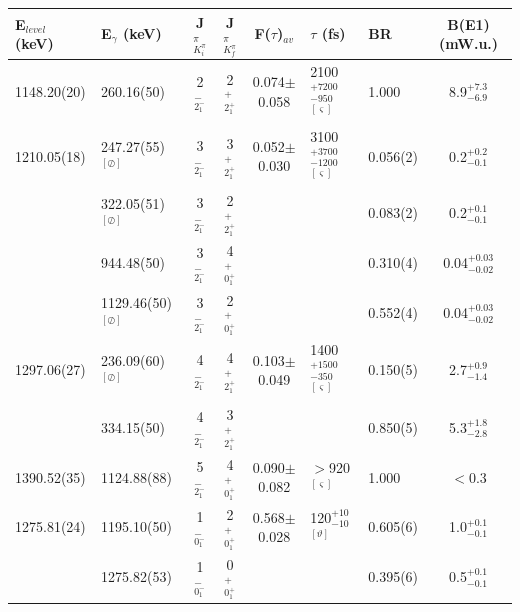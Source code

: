 \begin{landscape}
\begin{center}
\begin{longtable}{llcccllc}
E$_{level}$ (keV) & E$_\gamma$ (keV) & J$^\pi_{K^\pi_i}$ & J$^\pi_{K^\pi_f}$   & F($\tau$)$_{av}$ & $\tau$ (fs)                     & BR        & B(E1) (mW.u.)\\ \hline \hline \endhead
 1148.20(20) &  260.16(50)               & 2$^-_{2^-_1}$      & 2$^+_{2^+_1}$ &0.074$\pm$0.058& 2100$^{+7200}_{-950}$ $^{[\varsigma]}$          &1.000                 & 8.9$^{+7.3}_{-6.9}$  \\ 
 1210.05(18) &  247.27(55)$^{[\oslash]}$ & 3$^-_{2^-_1}$      & 3$^+_{2^+_1}$ &0.052$\pm$0.030& 3100$^{+3700}_{-1200}$ $^{[\varsigma]}$         &0.056(2)              & 0.2$^{+0.2}_{-0.1}$ \\
             &  322.05(51)$^{[\oslash]}$ & 3$^-_{2^-_1}$      & 2$^+_{2^+_1}$ &&                                                            &0.083(2)              & 0.2$^{+0.1}_{-0.1}$ \\
             &  944.48(50)               & 3$^-_{2^-_1}$      & 4$^+_{0^+_1}$ &&                                                            &0.310(4)              & 0.04$^{+0.03}_{-0.02}$  \\
             & 1129.46(50)$^{[\oslash]}$ & 3$^-_{2^-_1}$      & 2$^+_{0^+_1}$ &&                                                            &0.552(4)              & 0.04$^{+0.03}_{-0.02}$  \\ 
 1297.06(27) &  236.09(60)$^{[\oslash]}$ & 4$^-_{2^-_1}$      & 4$^+_{2^+_1}$ &0.103$\pm$0.049& 1400$^{+1500}_{-350}$ $^{[\varsigma]}$          &0.150(5)              & 2.7$^{+0.9}_{-1.4}$    \\
             &  334.15(50)               & 4$^-_{2^-_1}$      & 3$^+_{2^+_1}$ &&                                                            &0.850(5)              & 5.3$^{+1.8}_{-2.8}$   \\ 
 1390.52(35) & 1124.88(88)               & 5$^-_{2^-_1}$      & 4$^+_{0^+_1}$ &0.090$\pm$0.082& $>$920 $^{[\varsigma]}$                         &1.000                 & $<$0.3               \\ \hline
 1275.81(24) & 1195.10(50)               & 1$^-_{0^-_1}$      & 2$^+_{0^+_1}$ &0.568$\pm$0.028& 120$^{+10}_{-10}$ $^{[\vartheta]}$             & 0.605(6)             & 1.0$^{+0.1}_{-0.1}$ \\
             & 1275.82(53)               & 1$^-_{0^-_1}$      & 0$^+_{0^+_1}$ &&                                                            & 0.395(6)             & 0.5$^{+0.1}_{-0.1}$ \\ 

\end{longtable}
\end{center}
\end{landscape}

